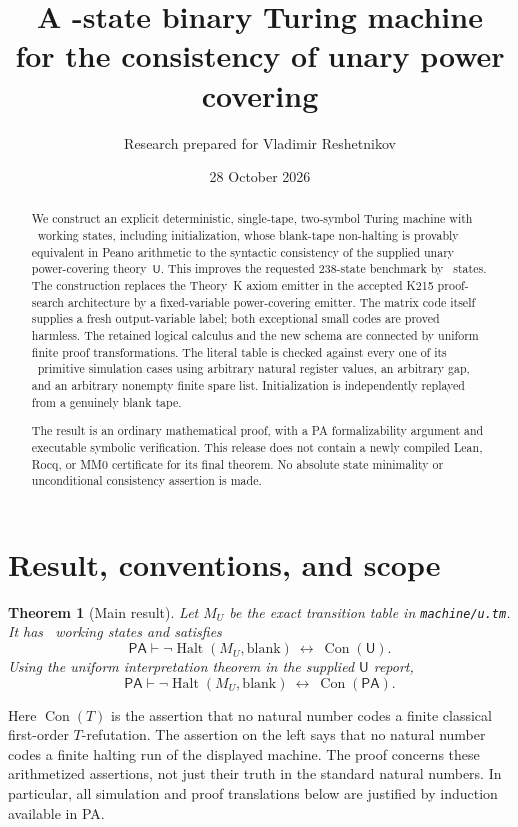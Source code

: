 \documentclass[11pt]{article}
\title{A \Nstates-state binary Turing machine\texorpdfstring{\\}{ }for the consistency of unary power covering}
\author{Research prepared for Vladimir Reshetnikov}
\date{28 October 2026}
\newcommand{\PA}{\mathsf{PA}}
\newcommand{\ThU}{\mathsf U}
\newcommand{\Con}{\operatorname{Con}}
\newcommand{\Halt}{\operatorname{Halt}}
\newtheorem{theorem}{Theorem}[section]
\theoremstyle{definition}\newtheorem{definition}[theorem]{Definition}
\begin{document}
\maketitle
\begin{abstract}
We construct an explicit deterministic, single-tape, two-symbol Turing machine
with \Nstates\ working states, including initialization, whose blank-tape
non-halting is provably equivalent in Peano arithmetic to the syntactic
consistency of the supplied unary power-covering theory~$\ThU$.
This improves the requested 238-state benchmark by \Saving\ states.
The construction replaces the Theory~K axiom emitter in the accepted K215
proof-search architecture by a fixed-variable power-covering emitter. The
matrix code itself supplies a fresh output-variable label; both exceptional
small codes are proved harmless. The retained logical
calculus and the new schema are connected by uniform finite proof
transformations. The literal table is checked against every one of its
\Ncases\ primitive simulation cases using arbitrary natural register values,
an arbitrary gap, and an arbitrary nonempty finite spare list. Initialization is
independently replayed from a genuinely blank tape.

The result is an ordinary mathematical proof, with a PA formalizability
argument and executable symbolic verification. This release does not contain
a newly compiled Lean, Rocq, or MM0 certificate for its final theorem. No
absolute state minimality or unconditional consistency assertion is made.
\end{abstract}

\section{Result, conventions, and scope}

\begin{theorem}[Main result]\label{thm:main}
Let $M_U$ be the exact transition table in \texttt{machine/u.tm}.
It has \Nstates\ working states and satisfies
\[
 \PA\vdash \neg\Halt(M_U,\mathrm{blank})\ \longleftrightarrow\ \Con(\ThU).
\]
Using the uniform interpretation theorem in the supplied $\ThU$ report,
\[
 \PA\vdash \neg\Halt(M_U,\mathrm{blank})\ \longleftrightarrow\ \Con(\PA).
\]
\end{theorem}

Here $\Con(T)$ is the assertion that no natural number codes a finite
classical first-order $T$-refutation. The assertion on the left says that no
natural number codes a finite halting run of the displayed machine.
The proof concerns these arithmetized assertions, not just their truth in
the standard natural numbers. In particular, all simulation and proof
translations below are justified by induction available in PA.
\end{document}
